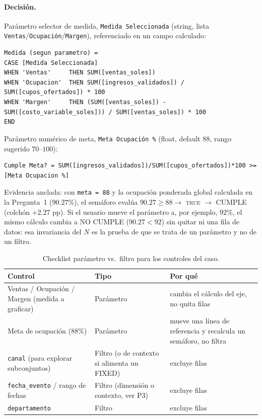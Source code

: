 \paragraph{Decisión.} Parámetro selector de medida, \lstinline|Medida Seleccionada| (string, lista \lstinline|Ventas|/\lstinline|Ocupación|/\lstinline|Margen|), referenciado en un campo calculado:
\begin{lstlisting}[style=cod]
Medida (segun parametro) =
CASE [Medida Seleccionada]
WHEN 'Ventas'     THEN SUM([ventas_soles])
WHEN 'Ocupacion'  THEN SUM([ingresos_validados]) / SUM([cupos_ofertados]) * 100
WHEN 'Margen'     THEN (SUM([ventas_soles]) - SUM([costo_variable_soles])) / SUM([ventas_soles]) * 100
END
\end{lstlisting}
Parámetro numérico de meta, \lstinline|Meta Ocupación %| (float, default $88$, rango sugerido $70$--$100$):
\begin{lstlisting}[style=cod]
Cumple Meta? = SUM([ingresos_validados])/SUM([cupos_ofertados])*100 >= [Meta Ocupacion %]
\end{lstlisting}
Evidencia anclada: con \lstinline|meta = 88| y la ocupación ponderada global calculada en la Pregunta~1 ($90.27\%$), el semáforo evalúa $90.27 \geq 88 \to$ \textsc{true} $\to$ CUMPLE (colchón $+2.27$ pp). Si el usuario mueve el parámetro a, por ejemplo, $92\%$, el mismo cálculo cambia a NO CUMPLE ($90.27 < 92$) sin quitar ni una fila de datos: esa invariancia del $N$ es la prueba de que se trata de un parámetro y no de un filtro.

\begin{table}[H]
\centering\small
\begin{tabularx}{\linewidth}{lll}
\toprule
Control & Tipo & Por qué \\
\midrule
Ventas / Ocupación / Margen (medida a graficar) & Parámetro & cambia el cálculo del eje, no quita filas \\
Meta de ocupación ($88\%$) & Parámetro & mueve una línea de referencia y recalcula un semáforo, no filtra \\
\lstinline|canal| (para explorar subconjuntos) & Filtro (o de contexto si alimenta un FIXED) & excluye filas \\
\lstinline|fecha_evento| / rango de fechas & Filtro (dimensión o contexto, ver P3) & excluye filas \\
\lstinline|departamento| & Filtro & excluye filas \\
\bottomrule
\end{tabularx}
\caption{Checklist parámetro vs.\ filtro para los controles del caso.}
\end{table}

